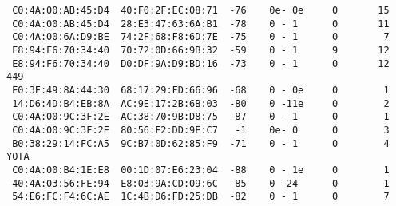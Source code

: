 \documentclass[10pt,a4paper]{article}
\begin{document}
\begin{itemize}
\begin{lstlisting}
 C0:4A:00:AB:45:D4  40:F0:2F:EC:08:71  -76    0e- 0e     0       15                                                                                                                                                                          
 C0:4A:00:AB:45:D4  28:E3:47:63:6A:B1  -78    0 - 1      0       11                                                                                                                                                                          
 C0:4A:00:6A:D9:BE  74:2F:68:F8:6D:7E  -75    0 - 1      0        7                                                                                                                                                                          
 E8:94:F6:70:34:40  70:72:0D:66:9B:32  -59    0 - 1      9       12                                                                                                                                                                          
 E8:94:F6:70:34:40  D0:DF:9A:D9:BD:16  -73    0 - 1      0       12  449                                                                                                                                                                     
 E0:3F:49:8A:44:30  68:17:29:FD:66:96  -68    0 - 0e     0        1                                                                                                                                                                          
 14:D6:4D:B4:EB:8A  AC:9E:17:2B:6B:03  -80    0 -11e     0        2                                                                                                                                                                          
 C0:4A:00:9C:3F:2E  AC:38:70:9B:D8:75  -87    0 - 1      0        1                                                                                                                                                                          
 C0:4A:00:9C:3F:2E  80:56:F2:DD:9E:C7   -1    0e- 0      0        3                                                                                                                                                                          
 B0:38:29:14:FC:A5  9C:B7:0D:62:85:F9  -71    0 - 1      0        4  YOTA                                                                                                                                                                    
 C0:4A:00:B4:1E:E8  00:1D:07:E6:23:04  -88    0 - 1e     0        1                                                                                                                                                                          
 40:4A:03:56:FE:94  E8:03:9A:CD:09:6C  -85    0 -24      0        1                                                                                                                                                                          
 54:E6:FC:F4:6C:AE  1C:4B:D6:FD:25:DB  -82    0 - 1      0        7 
\end{lstlisting}


\end{itemize}
\end{document}
